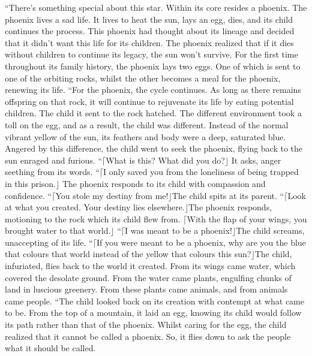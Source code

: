 \documentclass[openany, 12pt]{book}
\newcommand\bird[1]{$\lceil$#1$\rfloor$\tab}
\newcommand\tab[1][1cm]{\hspace*{#1}}
\begin{document}
\tab
``There’s something special about this star. Within its core resides a phoenix. The phoenix lives a sad life. It lives to heat the sun, lays an egg, dies, and its child continues the process. This phoenix had thought about its lineage and decided that it didn’t want this life for its children. The phoenix realized that if it dies without children to continue its legacy, the sun won’t survive. For the first time throughout its family history, the phoenix lays two eggs. One of which is sent to one of the orbiting rocks, whilst the other becomes a meal for the phoenix, renewing its life.
\newline
\tab
``For the phoenix, the cycle continues. As long as there remains offspring on that rock, it will continue to rejuvenate its life by eating potential children. The child it sent to the rock hatched. The different environment took a toll on the egg, and as a result, the child was different. Instead of the normal vibrant yellow of the sun, its feathers and body were a deep, saturated blue. Angered by this difference, the child went to seek the phoenix, flying back to the sun enraged and furious.
\newline
\tab
``\bird{What is this? What did you do?} It asks, anger seething from its words.
\newline
\tab
``\bird{I only saved you from the loneliness of being trapped in this prison.} The phoenix responds to its child with compassion and confidence.
\newline
\tab
``\bird{You stole my destiny from me!}The child spits at its parent. 
\newline
\tab
``\bird{Look at what you created. Your destiny lies elsewhere.}The phoenix responds, motioning to the rock which its child flew from. \bird{With the flap of your wings, you brought water to that world.}
\newline
\tab
``\bird{I was meant to be a phoenix!}The child screams, unaccepting of its life.
\newline
\tab
``\bird{If you were meant to be a phoenix, why are you the blue that colours that world instead of the yellow that colours this sun?}The child, infuriated, flies back to the world it created. From its wings came water, which covered the desolate ground. From the water came plants, engulfing chunks of land in luscious greenery. From these plants came animals, and from animals came people. 
\newline
\tab
``The child looked back on its creation with contempt at what came to be. From the top of a mountain, it laid an egg, knowing its child would follow its path rather than that of the phoenix. Whilst caring for the egg, the child realized that it cannot be called a phoenix. So, it flies down to ask the people what it should be called.
\end{document}
